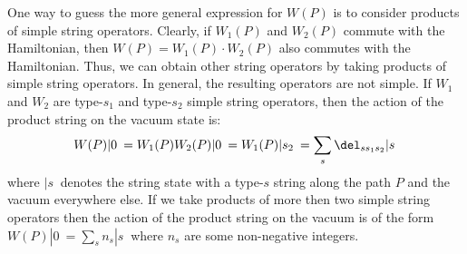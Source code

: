 \documentclass[aps,twocolumn,groupedaddress,showpacs,floatfix]{revtex4}
\begin{document}
One way to guess the more general expression for $W(P)$ is to consider
products of simple string operators. Clearly, if $W_1(P)$ and $W_2(P)$
commute with the Hamiltonian, then $W(P) = W_1(P) \cdot W_2(P)$ also commutes
with the Hamiltonian. Thus, we can obtain other string operators by taking
products of simple string operators. In general, the resulting operators
are not simple. If $W_1$ and $W_2$ are type-$s_1$ and type-$s_2$ simple
string operators, then the action of the product string on the vacuum state is:
\begin{displaymath}
W(P) |0\> = W_1(P)W_2(P)|0\> = W_1(P) |s_2\> = 
\sum_{s} \del_{ss_1s_2} |s\>
\end{displaymath}
where $|s\>$ denotes the string state with a type-$s$ string along the path 
$P$ and the vacuum everywhere else. If we take products of more then two
simple string operators then the action of the product string on the
vacuum is of the form $W(P)|0\> = \sum_{s} n_{s} |s\>$ where $n_s$ are
some non-negative integers. 
\end{document}
